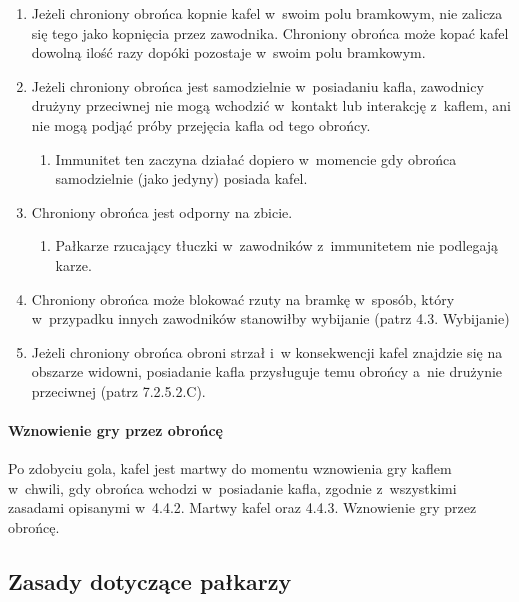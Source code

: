 \documentclass[12pt,a4paper]{article}
\begin{document}
\begin{enumerate}
	\item
	      Jeżeli chroniony obrońca kopnie kafel w~swoim polu bramkowym, nie
	      zalicza się tego jako kopnięcia przez zawodnika. Chroniony obrońca
	      może kopać kafel dowolną ilość razy dopóki pozostaje w~swoim polu
	      bramkowym.
	\item
	      Jeżeli chroniony obrońca jest samodzielnie w~posiadaniu kafla,
	      zawodnicy drużyny przeciwnej nie mogą wchodzić w~kontakt lub
	      interakcję z~kaflem, ani nie mogą podjąć próby przejęcia kafla od tego
	      obrońcy.

	      \begin{enumerate}
		      \item
		            Immunitet ten zaczyna działać dopiero w~momencie gdy obrońca
		            samodzielnie (jako jedyny) posiada kafel.
	      \end{enumerate}
	\item
	      Chroniony obrońca jest odporny na zbicie.

	      \begin{enumerate}
		      \item
		            Pałkarze rzucający tłuczki w~zawodników z~immunitetem nie podlegają
		            karze.
	      \end{enumerate}
	\item
	      Chroniony obrońca może blokować rzuty na bramkę w~sposób, który w~przypadku innych zawodników stanowiłby wybijanie (patrz 4.3.
	      Wybijanie)
	\item
	      Jeżeli chroniony obrońca obroni strzał i~w konsekwencji kafel znajdzie
	      się na obszarze widowni, posiadanie kafla przysługuje temu obrońcy a~nie drużynie przeciwnej (patrz 7.2.5.2.C).
\end{enumerate}

\paragraph{Wznowienie gry przez obrońcę}
Po zdobyciu gola, kafel
jest martwy do momentu wznowienia gry kaflem w~chwili, gdy obrońca
wchodzi w~posiadanie kafla, zgodnie z~wszystkimi zasadami opisanymi w~4.4.2. Martwy kafel oraz 4.4.3. Wznowienie gry przez obrońcę.

\subsection{Zasady dotyczące pałkarzy}
\end{document}
